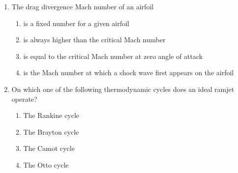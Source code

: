 \documentclass[journal,12pt,twocolumn]{IEEEtran}
\theoremstyle{remark}
\begin{document}
\begin{enumerate}
\item The drag divergence Mach number of an airfoil
\begin{enumerate}
\item is a fixed number for a given airfoil
\item is always higher than the critical Mach number
\item is equal to the critical Mach number at zero angle of attack
\item is the Mach number at which a shock wave first appears on the airfoil
\end{enumerate}


\item On which one of the following thermodynamic cycles does an ideal ramjet operate?
\begin{multicols}{2}
\begin{enumerate}
\item The Rankine cycle
\item The Brayton cycle
\item The Camot cycle
\item The Otto cycle
\end{enumerate}
\end{multicols}
\end{enumerate}
\end{document}
